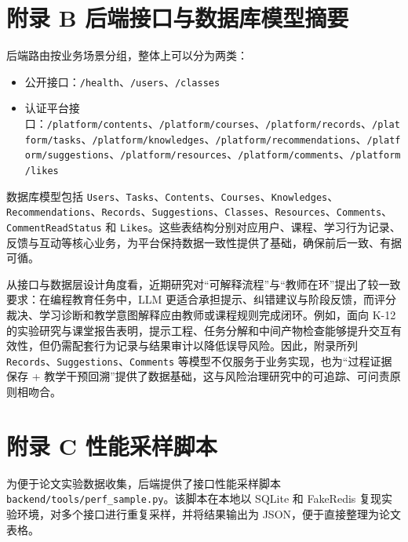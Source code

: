 \section*{附录 B 后端接口与数据库模型摘要}\label{ux9644ux5f55-b-ux540eux7aefux63a5ux53e3ux4e0eux6570ux636eux5e93ux6a21ux578bux6458ux8981}

后端路由按业务场景分组，整体上可以分为两类：

\begin{itemize}
  \item 公开接口：\texttt{/health}、\texttt{/users}、\texttt{/classes}
  \item 认证平台接口：\texttt{/platform/contents}、\texttt{/platform/courses}、\texttt{/platform/records}、\texttt{/platform/tasks}、\texttt{/platform/knowledges}、\texttt{/platform/recommendations}、\texttt{/platform/suggestions}、\texttt{/platform/resources}、\texttt{/platform/comments}、\texttt{/platform/likes}
\end{itemize}

数据库模型包括 \texttt{Users}、\texttt{Tasks}、\texttt{Contents}、\texttt{Courses}、\texttt{Knowledges}、\texttt{Recommendations}、\texttt{Records}、\texttt{Suggestions}、\texttt{Classes}、\texttt{Resources}、\texttt{Comments}、\texttt{CommentReadStatus} 和 \texttt{Likes}。这些表结构分别对应用户、课程、学习行为记录、反馈与互动等核心业务，为平台保持数据一致性提供了基础，确保前后一致、有据可循。

从接口与数据层设计角度看，近期研究对“可解释流程”与“教师在环”提出了较一致要求：在编程教育任务中，LLM 更适合承担提示、纠错建议与阶段反馈，而评分裁决、学习诊断和教学意图解释应由教师或课程规则完成闭环\cite{raihan2025cseduslr,ma2024teachableagent,jeon2023complementary}。例如，面向 K-12 的实验研究与课堂报告表明，提示工程、任务分解和中间产物检查能够提升交互有效性，但仍需配套行为记录与结果审计以降低误导风险\cite{tang2025middleschool,gonzalez2025k12gpt}。因此，附录所列 \texttt{Records}、\texttt{Suggestions}、\texttt{Comments} 等模型不仅服务于业务实现，也为“过程证据保存 + 教学干预回溯”提供了数据基础，这与风险治理研究中的可追踪、可问责原则相吻合\cite{pirzado2024pitfalls,humble2024risk,tlili2023devilangel}。

\section*{附录 C 性能采样脚本}\label{ux9644ux5f55-c-ux6027ux80fdux91c7ux6837ux811aux672c}

为便于论文实验数据收集，后端提供了接口性能采样脚本 \texttt{backend/tools/perf\_sample.py}。该脚本在本地以 SQLite 和 FakeRedis 复现实验环境，对多个接口进行重复采样，并将结果输出为 JSON，便于直接整理为论文表格。

